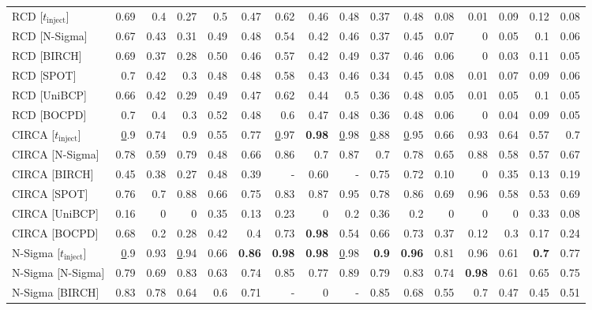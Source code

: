 \begin{table}[]
{\begin{tabular}{l|rrrrr|rrrrr|rrrrr}
RCD {[}$t_{\text{inject}}${]} & 0.69 & 0.4 & 0.27 & 0.5 & 0.47 & 0.62 & 0.46 & 0.48 & 0.37 & 0.48 & 0.08 & 0.01 & 0.09 & 0.12 & 0.08 \\
RCD {[}N-Sigma{]} & 0.67 & 0.43 & 0.31 & 0.49 & 0.48 & 0.54 & 0.42 & 0.46 & 0.37 & 0.45 & 0.07 & 0 & 0.05 & 0.1 & 0.06 \\
RCD {[}BIRCH{]} & 0.69 & 0.37 & 0.28 & 0.50 & 0.46 & 0.57 & 0.42 & 0.49 & 0.37 & 0.46 & 0.06 & 0 & 0.03 & 0.11 & 0.05 \\
RCD {[}SPOT{]} & 0.7 & 0.42 & 0.3 & 0.48 & 0.48 & 0.58 & 0.43 & 0.46 & 0.34 & 0.45 & 0.08 & 0.01 & 0.07 & 0.09 & 0.06 \\
RCD {[}UniBCP{]} & 0.66 & 0.42 & 0.29 & 0.49 & 0.47 & 0.62 & 0.44 & 0.5 & 0.36 & 0.48 & 0.05 & 0.01 & 0.05 & 0.1 & 0.05 \\
RCD {[}BOCPD{]} & 0.7 & 0.4 & 0.3 & 0.52 & 0.48 & 0.6 & 0.47 & 0.48 & 0.36 & 0.48 & 0.06 & 0 & 0.04 & 0.09 & 0.05 \\ \hline
CIRCA {[}$t_{\text{inject}}${]} & {\ul 0.9} & 0.74 & 0.9 & 0.55 & 0.77 & {\ul 0.97} & \textbf{0.98} & {\ul 0.98} & {\ul 0.88} & {\ul 0.95} & 0.66 & 0.93 & 0.64 & 0.57 & 0.7 \\
CIRCA {[}N-Sigma{]} & 0.78 & 0.59 & 0.79 & 0.48 & 0.66 & 0.86 & 0.7 & 0.87 & 0.7 & 0.78 & 0.65 & 0.88 & 0.58 & 0.57 & 0.67 \\
CIRCA {[}BIRCH{]} & 0.45 & 0.38 & 0.27 & 0.48 & 0.39 & - & 0.60 & - & 0.75 & 0.72 & 0.10 & 0 & 0.35 & 0.13 & 0.19 \\
CIRCA {[}SPOT{]} & 0.76 & 0.7 & 0.88 & 0.66 & 0.75 & 0.83 & 0.87 & 0.95 & 0.78 & 0.86 & 0.69 & 0.96 & 0.58 & 0.53 & 0.69 \\
CIRCA {[}UniBCP{]} & 0.16 & 0 & 0 & 0.35 & 0.13 & 0.23 & 0 & 0.2 & 0.36 & 0.2 & 0 & 0 & 0 & 0.33 & 0.08 \\
CIRCA {[}BOCPD{]} & 0.68 & 0.2 & 0.28 & 0.42 & 0.4 & 0.73 & \textbf{0.98} & 0.54 & 0.66 & 0.73 & 0.37 & 0.12 & 0.3 & 0.17 & 0.24 \\ \hline
N-Sigma {[}$t_{\text{inject}}${]} & {\ul 0.9} & 0.93 & {\ul 0.94} & 0.66 & \textbf{0.86} & \textbf{0.98} & \textbf{0.98} & {\ul 0.98} & \textbf{0.9} & \textbf{0.96} & 0.81 & 0.96 & 0.61 & \textbf{0.7} & 0.77 \\
N-Sigma {[}N-Sigma{]} & 0.79 & 0.69 & 0.83 & 0.63 & 0.74 & 0.85 & 0.77 & 0.89 & 0.79 & 0.83 & 0.74 & \textbf{0.98} & 0.61 & 0.65 & 0.75 \\
N-Sigma {[}BIRCH{]} & 0.83 & 0.78 & 0.64 & 0.6 & 0.71 & 		
- & 0 & - & 0.85 & 0.68 & 0.55 & 0.7 & 0.47 & 0.45 & 0.51 \\

\end{tabular}}
\end{table}
